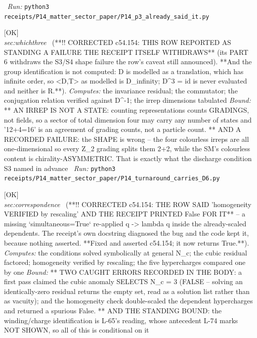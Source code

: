 \begin{description}
\ \emph{Run:} \texttt{python3 receipts/P14\_matter\_sector\_paper/P14\_p3\_already\_said\_it.py}
\item[\label{rcpt:P14_turnaround_carries_D6}\texttt{P14\_turnaround\_carries\_D6}]\hfill\textsf{[OK]}\\
\textit{sec:whichthree} \ (**!! CORRECTED c54.154: THIS ROW REPORTED AS STANDING A FAILURE THE RECEIPT ITSELF WITHDRAWS** (its PART 6 withdraws the S3/S4 shape failure the row's caveat still announced). **And the group identification is not computed: D is modelled as a translation, which has infinite order, so <D,T> as modelled is D\_infinity; D\textasciicircum{}3 = id is never evaluated and neither is R.**). 
\emph{Computes:} the invariance residual; the commutator; the conjugation relation verified against D\textasciicircum{}-1; the irrep dimensions tabulated
 \emph{Bound:} ** AN IRREP IS NOT A STATE: counting representations counts GRADINGS, not fields, so a sector of total dimension four may carry any number of states and '12+4=16' is an agreement of grading counts, not a particle count. ** AND A RECORDED FAILURE: the SHAPE is wrong -- the four colourless irreps are all one-dimensional so every Z\_2 grading splits them 2+2, while the SM's colourless content is chirality-ASYMMETRIC. That is exactly what the discharge condition S3 named in advance
\ \emph{Run:} \texttt{python3 receipts/P14\_matter\_sector\_paper/P14\_turnaround\_carries\_D6.py}
\item[\label{rcpt:P14_scale_and_ratio}\texttt{P14\_scale\_and\_ratio}]\hfill\textsf{[OK]}\\
\textit{sec:correspondence} \ (**!! CORRECTED c54.154: THE ROW SAID 'homogeneity VERIFIED by rescaling' AND THE RECEIPT PRINTED False FOR IT** -- a missing `simultaneous=True` re-applied q -> lambda q inside the already-scaled dependents. The receipt's own docstring diagnosed the bug and the code kept it, because nothing asserted. **Fixed and asserted c54.154; it now returns True.**). 
\emph{Computes:} the conditions solved symbolically at general N\_c; the cubic residual factored; homogeneity verified by rescaling; the five hypercharges compared one by one
 \emph{Bound:} ** TWO CAUGHT ERRORS RECORDED IN THE BODY: a first pass claimed the cubic anomaly SELECTS N\_c = 3 (FALSE -- solving an identically-zero residual returns the empty set, read as a solution list rather than as vacuity); and the homogeneity check double-scaled the dependent hypercharges and returned a spurious False. ** AND THE STANDING BOUND: the winding/charge identification is L-65's reading, whose antecedent L-74 marks NOT SHOWN, so all of this is conditional on it

\end{description}
